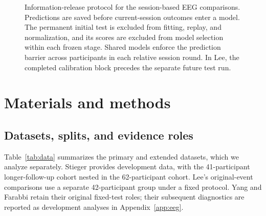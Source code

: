 \documentclass[11pt,a4paper]{article}
\begin{document}
\begin{figure}[t]
\centering
{}
\caption{Information-release protocol for the session-based EEG comparisons. Predictions are saved before current-session outcomes enter a model. The permanent initial test is excluded from fitting, replay, and normalization, and its scores are excluded from model selection within each frozen stage. Shared models enforce the prediction barrier across participants in each relative session round. In Lee, the completed calibration block precedes the separate future test run.}
\label{fig:timing}
\end{figure}

\section{Materials and methods}

\subsection{Datasets, splits, and evidence roles}

Table~\ref{tab:data} summarizes the primary and extended datasets, which we analyze separately. Stieger provides development data, with the 41-participant longer-follow-up cohort nested in the 62-participant cohort. Lee's original-event comparisons use a separate 42-participant group under a fixed protocol. Yang and Farabbi retain their original fixed-test roles; their subsequent diagnostics are reported as development analyses in Appendix~\ref{app:eeg}.
\end{document}
